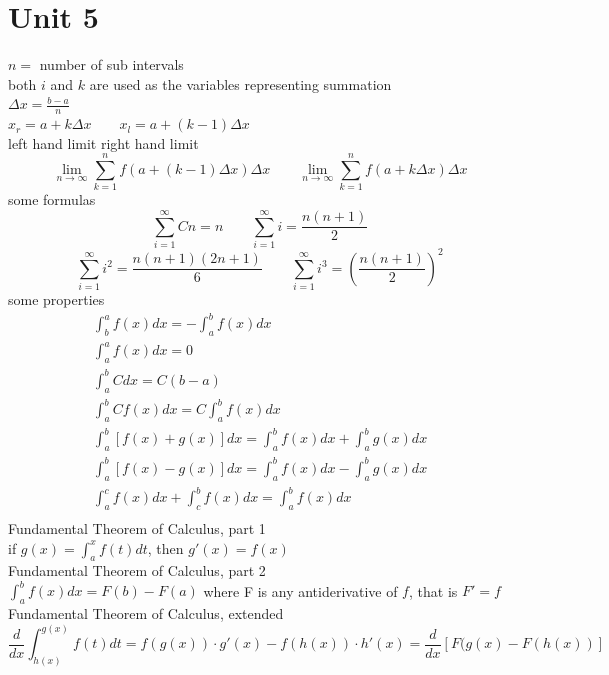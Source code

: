 \documentclass{article}
\begin{document}
\section*{Unit 5}
$n = $ number of sub intervals \\
both $i$ and $k$ are used as the variables representing summation \\
$\Delta x = \frac{b - a}{n}$ \\
$x_r = a+k\Delta x \qquad x_l = a+(k-1)\Delta x$ \\
\newline
\hfill left hand limit \hfill right hand limit \hfill
\hfill \[ \lim_{n\to\infty} \sum_{k=1}^{n} f(a + (k-1)\Delta x) \Delta x \qquad \lim_{n\to\infty} \sum_{k=1}^{n} f(a + k\Delta x) \Delta x \] \hfill 
some formulas \\
\[ \sum_{i=1}^{\infty}Cn = n \qquad \sum_{i=1}^{\infty}i = \frac{n(n+1)}{2} \]
\[ \sum_{i=1}^{\infty}i^2 = \frac{n(n+1)(2n+1)}{6} \qquad \sum_{i=1}^{\infty}i^3 = \left( \frac{n(n+1)}{2} \right)^2 \]
\newline
some properties \\
\begin{gather}
    \int_{b}^{a} f(x)dx = -\int_{a}^{b} f(x)dx \\
    \int_{a}^{a} f(x)dx = 0 \\
    \int_{a}^{b} Cdx = C(b-a) \\
    \int_{a}^{b} Cf(x)dx = C\int_{a}^{b} f(x)dx \\
    \int_{a}^{b} [f(x) + g(x)]dx = \int_{a}^{b} f(x)dx + \int_{a}^{b} g(x)dx \\
    \int_{a}^{b} [f(x) - g(x)]dx = \int_{a}^{b} f(x)dx - \int_{a}^{b} g(x)dx \\
    \int_{a}^{c} f(x)dx + \int_{c}^{b} f(x)dx = \int_{a}^{b} f(x)dx \\    
\end{gather}
\newline
Fundamental Theorem of Calculus, part 1 \\
if $g(x) = \int_{a}^{x}f(t)dt$, then $g'(x) = f(x)$ \\
\newline
Fundamental Theorem of Calculus, part 2 \\
$\int_{a}^{b}f(x)dx = F(b) - F(a)$ where F is any antiderivative of $f$, that is $F' = f$ \\
\newline
Fundamental Theorem of Calculus, extended \\
\begin{equation*}
    \frac{d}{dx} \int_{h(x)}^{g(x)} f(t)dt = f(g(x))\cdot g'(x) - f(h(x))\cdot h'(x) = \frac{d}{dx} [F(g(x)-F(h(x))]
\end{equation*}
\end{document}
